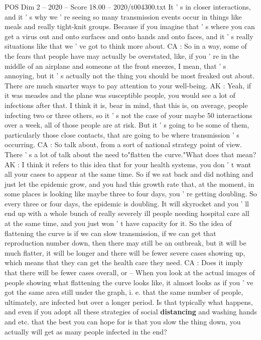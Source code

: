 \begin{textsample}{POS Dim 2 – 2020 – Score 18.00 – 2020/t004300.txt}
It ' s in closer interactions, and it ' s why we ' re seeing so many transmission events occur in things like meals and really tight-knit groups.
Because if you imagine that ' s where you can get a virus out and onto surfaces and onto hands and onto faces, and it ' s really situations like that we ' ve got to think more about.
CA : So in a way, some of the fears that people have may actually be overstated, like, if you ' re in the middle of an airplane and someone at the front sneezes, I mean, that ' s annoying, but it ' s actually not the thing you should be most freaked out about.
There are much smarter ways to pay attention to your well-being.
AK : Yeah, if it was measles and the plane was susceptible people, you would see a lot of infections after that.
I think it is, bear in mind, that this is, on average, people infecting two or three others, so it ' s not the case of your maybe 50 interactions over a week, all of those people are at risk.
But it ' s going to be some of them, particularly those close contacts, that are going to be where transmission ' s occurring.
CA : So talk about, from a sort of national strategy point of view.
There ' s a lot of talk about the need to"flatten the curve."What does that mean?
AK : I think it refers to this idea that for your health systems, you don ' t want all your cases to appear at the same time.
So if we sat back and did nothing and just let the epidemic grow, and you had this growth rate that, at the moment, in some places is looking like maybe three to four days, you ' re getting doubling.
So every three or four days, the epidemic is doubling.
It will skyrocket and you ' ll end up with a whole bunch of really severely ill people needing hospital care all at the same time, and you just won ' t have capacity for it.
So the idea of flattening the curve is if we can slow transmission, if we can get that reproduction number down, then there may still be an outbreak, but it will be much flatter, it will be longer and there will be fewer severe cases showing up, which means that they can get the health care they need.
CA : Does it imply that there will be fewer cases overall, or -- When you look at the actual images of people showing what flattening the curve looks like, it almost looks as if you ' ve got the same area still under the graph, i. e. that the same number of people, ultimately, are infected but over a longer period.
Is that typically what happens, and even if you adopt all these strategies of social \textbf{distancing} and washing hands and etc. that the best you can hope for is that you slow the thing down, you actually will get as many people infected in the end?

\end{textsample}
